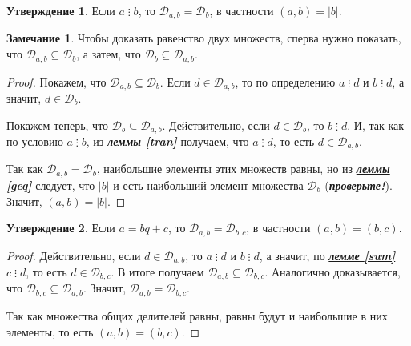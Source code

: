\documentclass[14pt, a4paper]{extarticle}
\theoremstyle{definition}
\newtheorem*{remark}{Замечание}
\newtheorem{statement}{Утверждение}
\newcommand{\divisible}{\mathop{\vdots}}
\begin{document}
	\begin{statement}
	\label{nodab}
		Если $a\divisible b$, то $\mathcal{D}_{a,b}=\mathcal{D}_b$, в частности $(a,b)=|b|$.
	\end{statement}
	\begin{remark}
		Чтобы доказать равенство двух множеств, сперва нужно показать, что $\mathcal{D}_{a,b}\subseteq\mathcal{D}_b$, а затем, что $\mathcal{D}_b\subseteq\mathcal{D}_{a,b}$.
	\end{remark}
	\begin{proof}
		Покажем, что $\mathcal{D}_{a,b}\subseteq\mathcal{D}_b$. Если $d\in\mathcal{D}_{a,b}$, то по определению $a\divisible d$ и $b\divisible d$, а значит, $d\in\mathcal{D}_b$.
		
		Покажем теперь, что $\mathcal{D}_b\subseteq\mathcal{D}_{a,b}$. Действительно, если $d\in\mathcal{D}_b$, то $b\divisible d$. И, так как по условию $a\divisible b$, из \hyperref[tran]{\textbf{\textit{леммы \ref*{tran}}}} получаем, что $a\divisible d$, то есть $d\in\mathcal{D}_{a,b}$.
		
		Так как $\mathcal{D}_{a,b}=\mathcal{D}_b$, наибольшие элементы этих множеств равны, но из \hyperref[geq]{\textbf{\textit{леммы \ref*{geq}}}} следует, что $|b|$ и есть наибольший элемент множества $\mathcal{D}_b$ (\textbf{\textit{проверьте!}}). Значит, $(a,b)=|b|$.
	\end{proof}

	\begin{statement}
	\label{nodabc}
		Если $a=bq+c$, то $\mathcal{D}_{a,b}=\mathcal{D}_{b,c}$, в частности \mbox{$(a,b)=(b,c)$}.
	\end{statement}
	\begin{proof}
		Действительно, если $d\in\mathcal{D}_{a,b}$, то $a\divisible d$ и $b\divisible d$, а значит, по \hyperref[sum]{\textbf{\textit{лемме \ref*{sum}}}} $c\divisible d$, то есть $d\in\mathcal{D}_{b,c}$. В итоге получаем \mbox{$\mathcal{D}_{a,b}\subseteq\mathcal{D}_{b,c}$}. Аналогично доказывается, что $\mathcal{D}_{b,c}\subseteq\mathcal{D}_{a,b}$. Значит, $\mathcal{D}_{a,b}=\mathcal{D}_{b,c}$.
		
		Так как множества общих делителей равны, равны будут и наибольшие в них элементы, то есть $(a,b)=(b,c)$.
	\end{proof}
\end{document}
